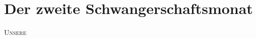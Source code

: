 \chapter*{Der zweite Schwangerschaftsmonat}

\lettrine[lines=2, loversize=0.3, lraise=0]{\initfamily U}{nsere}
